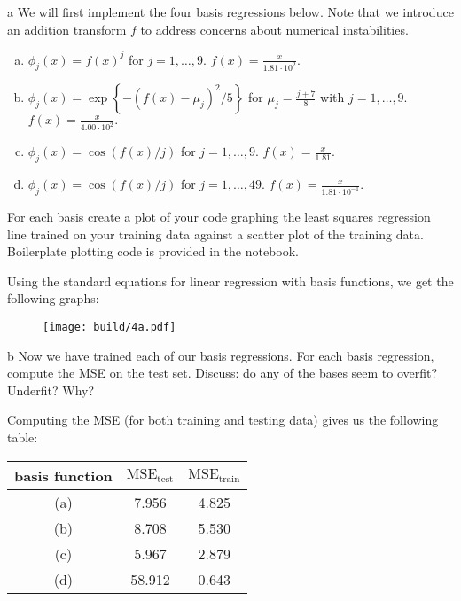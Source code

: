 \documentclass[expanded]{lkx_pset}
\begin{document}
\begin{parts}
  \begin{part}{a}
    We will first implement the four basis regressions below. Note that we introduce an addition transform $f$ to address concerns about numerical instabilities.
    \begin{enumerate}[(a)]
      \item $\phi_j(x)= f(x)^j$ for $j=1,\ldots, 9$. $f(x) = \frac{x}{1.81 \cdot 10^{2}}.$
      \item $\phi_j(x) = \exp\left\{-(f(x)-\mu_j)^2/5\right\}$ for $\mu_j=\frac{j + 7}{8}$ with $j=1,\ldots, 9$. $f(x) = \frac{x}{4.00 \cdot 10^{2}}.$
      \item $\phi_j(x) =  \cos(f(x) / j)$ for $j=1, \ldots, 9$. $f(x) = \frac{x}{1.81}$.
      \item $\phi_j(x) = \cos(f(x) / j)$ for $j=1, \ldots, 49$. $f(x) = \frac{x}{1.81 \cdot 10^{-1}}$. 
    \end{enumerate}

    For each basis create a plot of your code graphing the least squares regression line trained on your training data against a scatter plot of the training data. Boilerplate plotting code is provided in the notebook.
  \end{part}

  Using the standard equations for linear regression with basis functions, we get the following graphs:
  \begin{figure}[ht]
    \centering
    \texttt{[image: build/4a.pdf]}
  \end{figure}\noindent

  \begin{part}{b}
    Now we have trained each of our basis regressions.  For each basis
    regression, compute the MSE on the test set.  Discuss: do any of the
    bases seem to overfit?  Underfit?  Why?
  \end{part}
  Computing the MSE (for both training and testing data) gives us the following table:

  \begin{center}
    \renewcommand*{\arraystretch}{1.2}
    \begin{tabular}{|c|c|c|} 
     \hline
     basis function & $\textrm{MSE}_\textrm{test}$ & $\textrm{MSE}_\textrm{train}$\\ 
     \hline
     (a) & 7.956 & 4.825 \\
     (b) & 8.708 & 5.530\\
     (c) & 5.967 & 2.879\\
     (d) & 58.912 & 0.643\\
     \hline
    \end{tabular}
  \end{center}


\end{parts}
\end{document}
